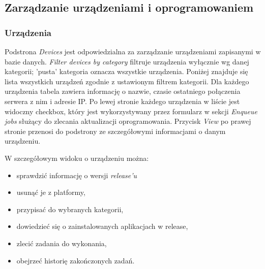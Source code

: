 \documentclass[polish,12pt]{aghthesis}
\begin{document}
\subsection{Zarządzanie urządzeniami i oprogramowaniem}
\subsubsection{Urządzenia}
Podstrona \emph{Devices} jest odpowiedzialna za zarządzanie urządzeniami zapisanymi w bazie danych. \emph{Filter devices by category} filtruje urządzenia wyłącznie wg danej kategorii; 'pusta' kategoria oznacza wszystkie urządzenia. Poniżej znajduje się lista wszystkich urządzeń zgodnie z ustawionym filtrem kategorii. Dla każdego urządzenia tabela zawiera informację o nazwie, czasie ostatniego połączenia serwera z nim i adresie IP. Po lewej stronie każdego urządzenia w liście jest widoczny checkbox, który jest wykorzystywany przez formularz w sekcji \emph{Enqueue jobs} służący do zlecania aktualizacji oprogramowania. Przycisk \emph{View} po prawej stronie przenosi do podstrony ze szczegółowymi informacjami o danym urządzeniu.

\centerline{
}

W szczegółowym widoku o urządzeniu można:
\begin{itemize}
\item sprawdzić informację o wersji \emph{release'u}
\item usunąć je z platformy,
\item przypisać do wybranych kategorii,
\item dowiedzieć się o zainstalowanych aplikacjach w release,
\item zlecić zadania do wykonania,
\item obejrzeć historię zakończonych zadań.
\end{itemize}
\clearpage
\end{document}
